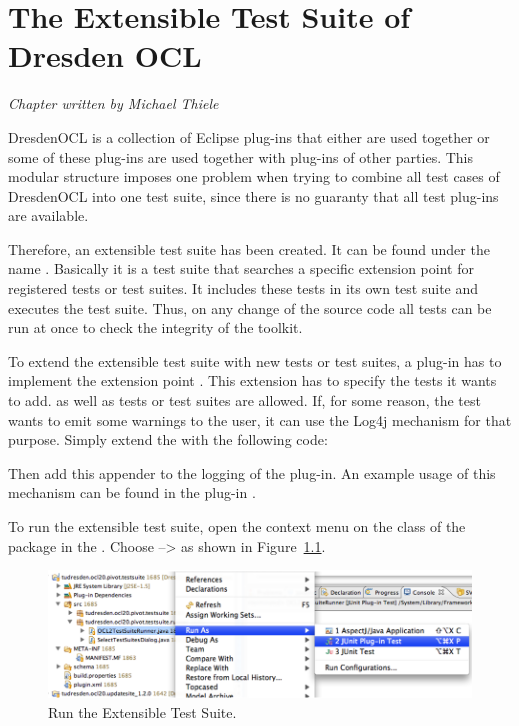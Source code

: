 \chapter{The Extensible Test Suite of Dresden OCL}
\label{chapter:generalTestSuite}

\begin{flushright}
\textit{Chapter written by Michael Thiele}
\end{flushright}

DresdenOCL is a collection of Eclipse plug-ins that either are used together or
some of these plug-ins are used together with plug-ins of other parties. This 
modular structure imposes one problem when trying to combine all test cases of 
DresdenOCL into one test suite, since there is no guaranty that all test
plug-ins are available.

Therefore, an extensible test suite has been created. It can be found under the 
name . Basically it is a
test suite that searches a specific extension point for registered tests or test
suites. It includes these tests in its own test suite and executes the test
suite. Thus, on any change of the source code all tests can be run at once to 
check the integrity of the toolkit.

To extend the extensible test suite with new tests or test suites, a plug-in has
to implement the extension point . 
This extension has to specify the tests it wants to add.  as
well as  tests or test suites are allowed. If, for some reason,
the test wants to emit some warnings to the user, it can use the Log4j mechanism
for that purpose. Simply extend the  with the following
code:


Then add this appender to the logging of the plug-in. An example usage of this 
mechanism can be found in the plug-in 
.

To run the extensible test suite, open the context menu on the class 
 of the package 
 in the 
. Choose  --\textgreater {} as shown in Figure~\ref{pic:generalTestSuite:RunAs}.

\begin{figure}[!htbp]
	\centering
	\includegraphics[width=1.0\linewidth]{figures/generalTestSuite/RunAs}
	\caption{Run the Extensible Test Suite.}
	\label{pic:generalTestSuite:RunAs}
\end{figure}